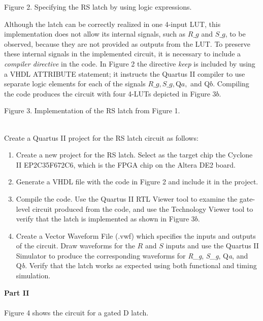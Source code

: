 \documentclass[epsfig,10pt,fullpage]{article}
\begin{document}
\begin{center}
Figure 2. Specifying the RS latch by using logic expressions.
\end{center}

Although the latch can be correctly realized in one 4-input LUT, this implementation
does not allow its internal signals, such as $R\_g$ and $S\_g$, to be observed, because
they are not provided as outputs from the LUT. To preserve these internal signals in 
the implemented circuit, it is necessary to include a {\it compiler
directive} in the code. In Figure 2 the directive {\it keep} is
included by using a VHDL ATTRIBUTE statement; it instructs the Quartus II compiler to 
use separate logic elements for each of
the signals $R\_g, S\_g, $Q$a,$ and Q$b$. Compiling the code produces the circuit with four
4-LUTs depicted in Figure 3$b$. 
~\\

\begin{figure}[H]
\scriptsize
\centerline{
\hbox{}}
\end{figure}
\centerline{Figure 3.  Implementation of the RS latch from Figure 1.}
~\\

Create a Quartus II project for the RS latch circuit as follows:

\begin{enumerate}
\item Create a new project for the RS latch. Select as the target chip the 
Cyclone II EP2C35F672C6, which is the FPGA chip on the Altera DE2 board. 
\item Generate a VHDL file with the code in Figure 2
and include it in the project. 
\item Compile the code. Use the Quartus II RTL Viewer tool to examine the gate-level
circuit produced from the code, and use the Technology Viewer tool 
to verify that the latch is implemented as shown in Figure 3$b$.
\item Create a Vector Waveform File (.vwf) which specifies the inputs and outputs
of the circuit. Draw waveforms for the $R$ and $S$ inputs and use the Quartus II Simulator to
produce the corresponding waveforms for {\it R\_g}, {\it S\_g}, Q{\it a}, and Q{\it b}.
Verify that the latch works as expected using both functional and timing simulation.
\end{enumerate}

\noindent
{\bf Part II}
~\\
~\\
\noindent
Figure 4 shows the circuit for a gated D latch.
\end{document}
